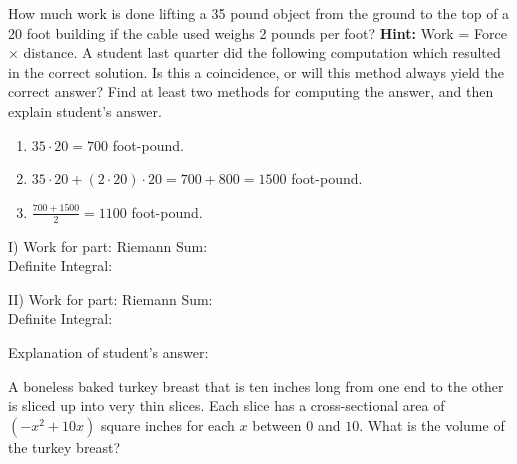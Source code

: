 \documentclass[answers]{exam}
\begin{document}
\begin{questions}
\begin{enumerate}[(I)]
\end{enumerate}

\newpage


\question How much work is done lifting a 35 pound object from the ground to the top of a 20 foot building if the cable used weighs 2 pounds per foot? \textbf{Hint:} Work = Force $\times$ distance. A student last quarter did the following computation which resulted in the correct solution. Is this a coincidence, or will this method always yield the correct answer? Find at least two methods for computing the answer, and then explain student's answer.

\begin{enumerate}[Step 1.]
	
	\item $35 \cdot 20 = 700$ foot-pound.	
	
	\item $35 \cdot 20 + (2 \cdot 20) \cdot 20 = 700 + 800 = 1500$ foot-pound.	
	
	
	\item $\frac{700+1500}{2} = 1100$ foot-pound.
	
			
\end{enumerate}

I) Work for part: \hspace{2in} Riemann Sum:\\

Definite Integral: \\

\vspace{1in}



II) Work for part: \hspace{2in} Riemann Sum:\\

Definite Integral: \\

\vspace{1in}

Explanation of student's answer:

\vspace{1in}

\question A boneless baked turkey breast that is ten inches long from one
end to the other is sliced up into very thin slices. Each slice
has a cross-sectional area of $(-x^2 +10x)$ square inches for each
$x$ between $0$ and $10$.  What is the volume of the turkey
breast?

\begin{enumerate}[(a)]
	

\end{enumerate}
\end{questions}
\end{document}
